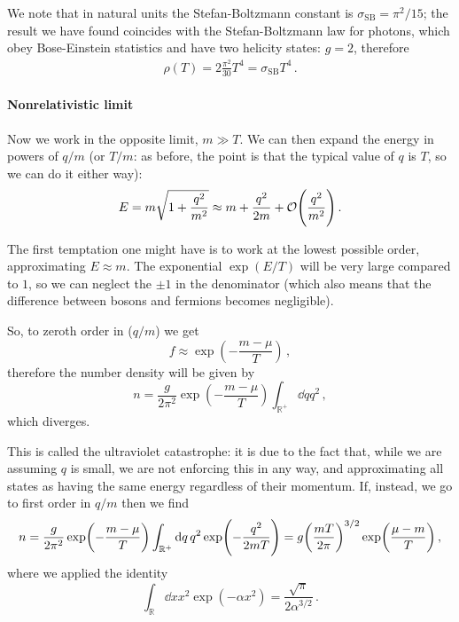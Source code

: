 \documentclass[main.tex]{subfiles}
\begin{document}
We note that in natural units the Stefan-Boltzmann constant is \(\sigma_{\text{SB}} = \pi^2 / 15\); the result we have found coincides with the Stefan-Boltzmann law for photons, which obey Bose-Einstein statistics and have two helicity states: \(g = 2\), therefore 
%
\begin{align}
\rho (T) = 2 \frac{\pi^2}{30 } T^{4} = \sigma_{\text{SB}} T^{4}
\,.
\end{align}

\paragraph{Nonrelativistic limit}

Now we work in the opposite limit, \(m \gg T\).
We can then expand the energy in powers of \(q/m\) (or \(T/m\): as before, the point is that the typical value of \(q\) is \(T\), so we can do it either way): 
%
\begin{align}
E = m \sqrt{1 + \frac{q^2}{m^2}} \approx m + \frac{q^2}{2m} + \mathcal{O}\qty( \frac{q^2}{m^2})
\,.
\end{align}

The first temptation one might have is to work at the lowest possible order, approximating \(E \approx m\). 
The exponential \(\exp(E / T)\) will be very large compared to \(1\), so we can neglect the \(\pm 1\) in the denominator (which also means that the difference between bosons and fermions becomes negligible).

So, to zeroth order in (\(q/m\)) we get 
%
\begin{equation}
  f \approx \exp(-\frac{m- \mu }{T}) 
\,,
\end{equation}
%
therefore the number density will be given by
%
\begin{equation}
  n = \frac{g}{2 \pi^2} \exp(-\frac{m- \mu }{T}) \int _{\mathbb{R}^{+}} \dd{q}q^2 
\,,
\end{equation}
%
which diverges.

This is called the ultraviolet catastrophe: it is due to the fact that, while we are assuming \(q\) is small, we are not enforcing this in any way, and approximating all states as having the same energy regardless of their momentum. If, instead, we go to first order in \(q/m\) then we find 
%
\begin{equation} \label{eq:boltzmann-statistics-number-density}
    n = \frac{g}{2 \pi^2} \exp(-\frac{m- \mu }{T}) \int _{\mathbb{R}^{+}} \dd{q}q^2 \exp(-\frac{q^2}{2mT}) 
    = g \qty(\frac{mT}{2 \pi })^{3/2} \exp(\frac{\mu - m}{T}) 
  \,,
\end{equation}
where we applied the identity 
%
\begin{equation}
  \int _{\mathbb{R}} \dd{x} x^2 \exp(-\alpha x^2) = \frac{\sqrt{\pi } }{2 \alpha^{3/2}} 
\,.
\end{equation}
%
\end{document}
